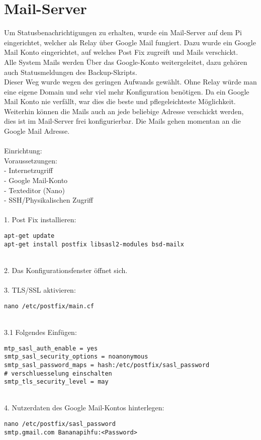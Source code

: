 \section{Mail-Server}
Um Statusbenachrichtigungen zu erhalten, wurde ein Mail-Server auf dem Pi eingerichtet, welcher als Relay über Google Mail fungiert. Dazu wurde ein Google Mail Konto eingerichtet, auf welches Post Fix zugreift und Mails verschickt.\\
Alle System Mails werden Über das Google-Konto weitergeleitet, dazu gehören auch Statusmeldungen des Backup-Skripts.\\
Dieser Weg wurde wegen des geringen Aufwands gewählt. Ohne Relay würde man eine eigene Domain und sehr viel mehr Konfiguration benötigen. Da ein Google Mail Konto nie verfällt, war dies die beste und pflegeleichteste Möglichkeit.\\
Weiterhin können die Mails auch an jede beliebige Adresse verschickt werden, dies ist im Mail-Server frei konfigurierbar. Die Mails gehen momentan an die Google Mail Adresse.\\
~\\
Einrichtung:\\
Voraussetzungen:\\
- Internetzugriff\\
- Google Mail-Konto\\
- Texteditor (Nano)\\
- SSH/Physikalischen Zugriff\\
~\\
1. Post Fix installieren:
\begin{lstlisting}
apt-get update
apt-get install postfix libsasl2-modules bsd-mailx
\end{lstlisting}
~\\
2. Das Konfigurationsfenster öffnet sich.\\
~\\
3. TLS/SSL aktivieren:
\begin{lstlisting}
nano /etc/postfix/main.cf
\end{lstlisting}
~\\
3.1 Folgendes Einfügen:
\begin{lstlisting}
mtp_sasl_auth_enable = yes
smtp_sasl_security_options = noanonymous
smtp_sasl_password_maps = hash:/etc/postfix/sasl_password
# verschluesselung einschalten
smtp_tls_security_level = may
\end{lstlisting}
~\\
4. Nutzerdaten des Google Mail-Kontos hinterlegen:
\begin{lstlisting}
nano /etc/postfix/sasl_password
smtp.gmail.com Bananapihfu:<Password>
\end{lstlisting}
